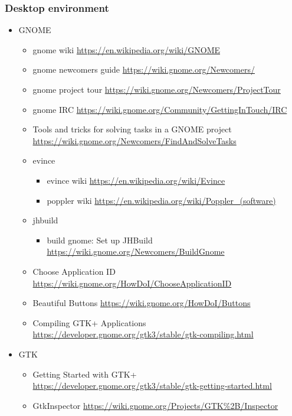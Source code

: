 \documentclass{article}
\begin{document}
\subsubsection{Desktop environment}
%
\begin{itemize}
    \item GNOME
        \begin{itemize}
            \item gnome wiki \url{https://en.wikipedia.org/wiki/GNOME}
            \item gnome newcomers guide \url{https://wiki.gnome.org/Newcomers/}
            \item gnome project tour \url{https://wiki.gnome.org/Newcomers/ProjectTour}
            \item gnome IRC \url{https://wiki.gnome.org/Community/GettingInTouch/IRC}
            \item Tools and tricks for solving tasks in a GNOME project
                  \url{https://wiki.gnome.org/Newcomers/FindAndSolveTasks}
            \item evince
                \begin{itemize}
                    \item evince wiki \url{https://en.wikipedia.org/wiki/Evince}
                    \item poppler wiki \url{https://en.wikipedia.org/wiki/Poppler_(software)}
                \end{itemize}
            \item jhbuild
                \begin{itemize}
                    \item build gnome: Set up JHBuild \url{https://wiki.gnome.org/Newcomers/BuildGnome}
                \end{itemize}
            \item Choose Application ID
                  \url{https://wiki.gnome.org/HowDoI/ChooseApplicationID}
            \item Beautiful Buttons
                  \url{https://wiki.gnome.org/HowDoI/Buttons}
            \item Compiling GTK+ Applications
                  \url{https://developer.gnome.org/gtk3/stable/gtk-compiling.html}
        \end{itemize}
    \item GTK
        \begin{itemize}
            \item Getting Started with GTK+
                  \url{https://developer.gnome.org/gtk3/stable/gtk-getting-started.html}
            \item GtkInspector \url{https://wiki.gnome.org/Projects/GTK\%2B/Inspector}
        \end{itemize}
\end{itemize}
%
\end{document}
